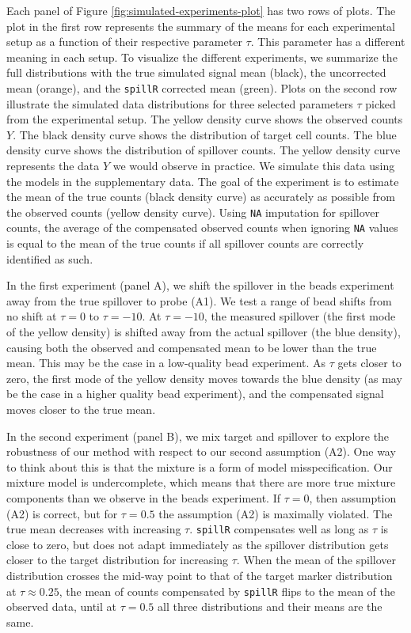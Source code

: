 \documentclass{bioinfo}
\begin{document}
Each panel of Figure \ref{fig:simulated-experiments-plot} has two rows
of plots. The plot in the first row represents the summary of the means
for each experimental setup as a function of their respective parameter
\(\tau\). This parameter has a different meaning in each setup. To
visualize the different experiments, we summarize the full distributions
with the true simulated signal mean (black), the uncorrected mean
(orange), and the \texttt{spillR} corrected mean (green). Plots on the
second row illustrate the simulated data distributions for three
selected parameters \(\tau\) picked from the experimental setup. The
yellow density curve shows the observed counts \(Y\). The black density
curve shows the distribution of target cell counts. The blue density
curve shows the distribution of spillover counts. The yellow density
curve represents the data \(Y\) we would observe in practice. We
simulate this data using the models in the supplementary data. The goal
of the experiment is to estimate the mean of the true counts (black
density curve) as accurately as possible from the observed counts
(yellow density curve). Using \texttt{NA} imputation for spillover
counts, the average of the compensated observed counts when ignoring
\texttt{NA} values is equal to the mean of the true counts if all
spillover counts are correctly identified as such.

In the first experiment (panel A), we shift the spillover in the beads
experiment away from the true spillover to probe (A1). We test a range
of bead shifts from no shift at \(\tau = 0\) to \(\tau = -10\). At
\(\tau = -10\), the measured spillover (the first mode of the yellow
density) is shifted away from the actual spillover (the blue density),
causing both the observed and compensated mean to be lower than the true
mean. This may be the case in a low-quality bead experiment. As \(\tau\)
gets closer to zero, the first mode of the yellow density moves towards
the blue density (as may be the case in a higher quality bead
experiment), and the compensated signal moves closer to the true mean.

In the second experiment (panel B), we mix target and spillover to
explore the robustness of our method with respect to our second
assumption (A2). One way to think about this is that the mixture is a
form of model misspecification. Our mixture model is undercomplete,
which means that there are more true mixture components than we observe
in the beads experiment. If \(\tau = 0\), then assumption (A2) is
correct, but for \(\tau = 0.5\) the assumption (A2) is maximally
violated. The true mean decreases with increasing \(\tau\).
\texttt{spillR} compensates well as long as \(\tau\) is close to zero,
but does not adapt immediately as the spillover distribution gets closer
to the target distribution for increasing \(\tau\). When the mean of the
spillover distribution crosses the mid-way point to that of the target
marker distribution at \(\tau \approx 0.25\), the mean of counts
compensated by \texttt{spillR} flips to the mean of the observed data,
until at \(\tau = 0.5\) all three distributions and their means are the
same.
\end{document}
